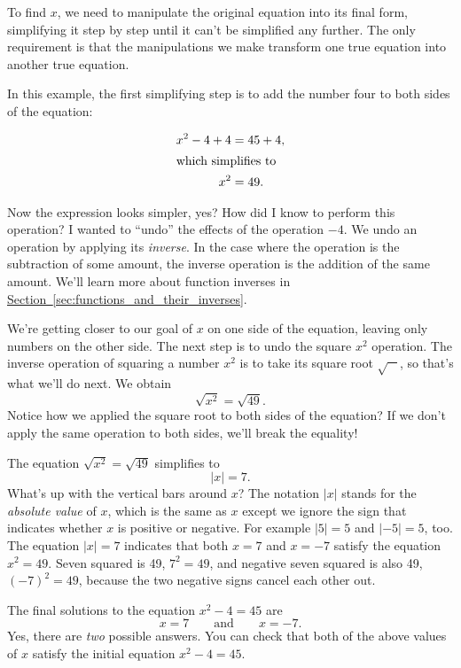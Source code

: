 	To find $x$,
	we need to manipulate the original equation into its final form,
	simplifying it step by step until it can't be simplified any further.
	The only requirement is that the manipulations we make transform one true equation into another true equation.

	In this example,
	the first simplifying step is to add the number four to both sides of the equation:

	\begin{align*}
	 	x^2-4  +4  		& =45    +4, 	    \\
	\shortintertext{which simplifies to}
		x^2 	 		& =49.
	\end{align*}

	Now the expression looks simpler, yes?
	How did I know to perform this operation? 
	I wanted to ``undo'' the effects of the operation $-4$.
	We undo an operation by applying its \emph{inverse}.
	In the case where the operation is the subtraction of some amount, the inverse operation is the addition of the same amount.
	We'll learn more about function inverses in 
	\hyperref[sec:functions_and_their_inverses]{Section~\ref{sec:functions_and_their_inverses}}. 

	We're getting closer to our goal of  $x$ on one side of the equation,
	leaving only numbers on the other side.
	The next step is to undo the square $x^2$ operation.
	The inverse operation of squaring a number $x^2$ is to take its square root $\sqrt{\phantom{a}\ }$,
	so that's what we'll do next. We obtain
	\[ 
	   \sqrt{x^2} 		= 	\sqrt{49}.
	\]
	Notice how we applied the square root  to both sides of the equation? 
	If we don't apply the same operation to both sides, we'll break the equality!

	The equation $\sqrt{x^2}= \sqrt{49}$ simplifies to 
	\[
	 	|x|	= 	7.
	 \]
	What's up with the vertical bars around $x$?
	The notation $|x|$ stands for the \emph{absolute value} of $x$,											
	which is the same as $x$ except we ignore the sign that indicates whether $x$ is positive or negative. 
	For example $|5|=5$ and $|-5|=5$, too.
	The equation $|x|=7$ indicates that both $x=7$ and $x=-7$ satisfy the equation $x^2 = 49$.
	Seven squared is 49, $7^2=49$, and negative seven squared is also 49, $(-7)^2 = 49$,
	because the two negative signs cancel each other out.

	The final solutions to the equation $x^2-4=45$ are
	\[
	 x  = 7 \qquad \textrm{and} \qquad   x=  - 7.
	\]
	Yes, there are \emph{two} possible answers. 
	You can check that both of the above values of $x$ satisfy the initial equation $x^2-4=45$.

